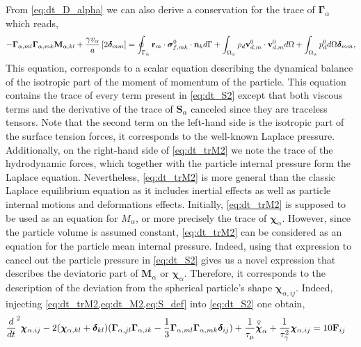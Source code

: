 From \ref{eq:dt_D_alpha} we can also derive a conservation for the trace of $\bm\Gamma_\alpha$ which reads, 
\begin{equation}
    -  \bm\Gamma_{\alpha,ml}\bm\Gamma_{\alpha,mk} \textbf{M}_{\alpha,kl}  
    + \frac{\gamma v_\alpha }{a} 
    \left[
    2\bm\delta_{mm} 
    \right]
    = 
    \intS{\textbf{r}_m\cdot\bm\sigma_{f,mk}^0\cdot \textbf{n}_k} 
    + \intO{\rho_d \textbf{v}_{d,m}^0\cdot \textbf{v}_{d,m}^0}
    + \intO{p_d^0} \bm\delta_{mm},
    \label{eq:dt_trM2}
\end{equation}
This equation, corresponds to a scalar equation describing the dynamical balance of the isotropic part of the moment of momentum of the particle. 
This equation contains the trace of every term present in \ref{eq:dt_S2} except that both viscous terms and the derivative of the trace of $\textbf{S}_\alpha$ canceled since they are traceless tensors. 
Note that the second term on the left-hand side is the isotropic part of the surface tension forces, it corresponds to the well-known Laplace pressure. 
Additionally, on the right-hand side of \ref{eq:dt_trM2} we note the trace of the hydrodynamic forces, which together with the particle internal pressure form the Laplace equation. 
Nevertheless, \ref{eq:dt_trM2} is more general than the classic Laplace equilibrium equation as it includes inertial effects as well as particle internal motions and deformations effects.  
Initially, \ref{eq:dt_trM2} is supposed to be used as an equation for $M_\alpha$, or more precisely the trace of $\bm\chi_\alpha$.
However, since the particle volume is assumed constant, \ref{eq:dt_trM2} can be considered as an equation for the particle mean internal pressure. 
Indeed, using that expression to cancel out the particle pressure in \ref{eq:dt_S2} gives us a novel expression that describes the deviatoric part of $\textbf{M}_\alpha$ or $\bm\chi_\alpha$.
Therefore, it corresponds to the description of the deviation from the spherical particle's shape $\bm\chi_{\alpha,ij}$. 
Indeed, injecting \ref{eq:dt_trM2,eq:dt_M2,eq:S_def} into  \ref{eq:dt_S2} one obtain, 
\begin{align}
        \ddt^2 \bm\chi_{\alpha,ij}
        - 2(\bm\chi_{\alpha,kl} + \bm\delta_{kl})
        (\bm\Gamma_{\alpha,jl}\bm\Gamma_{\alpha,ik}  
        - \frac{1}{3}
        \bm\Gamma_{\alpha,ml}\bm\Gamma_{\alpha,mk}  
        \bm\delta_{ij}
        )
    &+ 
    \frac{1}{\tau_\mu}
    \overset{ \triangledown  }{\bm\chi}_\alpha
    +
    \frac{1}{\tau_\gamma^2}
    \bm\chi_{\alpha,ij}
    = 
    10 \textbf{F}_{ij}
    \label{eq:dev}
\end{align}
